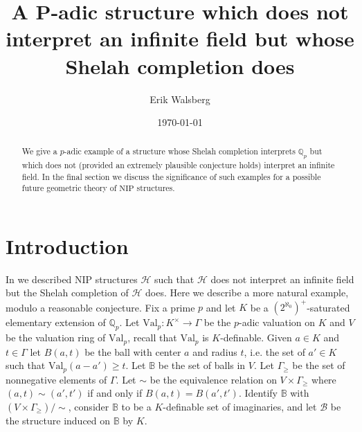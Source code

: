 \documentclass[bibalpha]{amsart}
\theoremstyle{definition}
\theoremstyle{remark}
\newcommand{\valp}{\mathrm{Val}_p}
\newcommand{\nip}{\mathrm{NIP}}
\newcommand{\Sa}[1]{\ensuremath{\mathscr{#1}}}
\newcommand{\B}{\mathbb{B}}
\newcommand{\Q}{\mathbb{Q}}
\begin{document}
\title[]{A P-adic structure which does not interpret an infinite field but whose Shelah completion does}



\author{Erik Walsberg}
\address{Department of Mathematics, Statistics, and Computer Science\\
Department of Mathematics\\University of California, Irvine, 340 Rowland Hall (Bldg.\# 400),
Irvine, CA 92697-3875}


\date{\today}

\maketitle

\begin{abstract}
We give a $p$-adic example of a structure whose Shelah completion interprets $\mathbb{Q}_p$ but which does not (provided an extremely plausible conjecture holds) interpret an infinite field.
In the final section we discuss the significance of such examples for a possible future geometric theory of $\mathrm{NIP}$ structures.
\end{abstract}

\section{Introduction}
\noindent
In \cite{big-nip,field-in-Shelah} we described $\nip$ structures $\Sa H$ such that $\Sa H$ does not interpret an infinite field but the Shelah completion of $\Sa H$ does.
Here we describe a more natural example, modulo a reasonable conjecture.
Fix a prime $p$ and let $K$ be a $(2^{\aleph_0})^+$-saturated elementary extension of $\Q_p$.
Let $\valp : K^\times \to \Gamma$ be the $p$-adic valuation on $K$ and $V$ be the valuation ring of $\valp$, recall that $\valp$ is $K$-definable.
Given $a \in K$ and $t \in \Gamma$ let $B(a,t)$ be the ball with center $a$ and radius $t$, i.e. the set of $a' \in K$ such that $\valp(a - a') \geq t$.
Let $\B$ be the set of balls in $V$.
Let $\Gamma_\geq$ be the set of nonnegative elements of $\Gamma$.
Let $\sim$ be the equivalence relation on $V \times \Gamma_\geq$ where $(a,t) \sim (a',t')$ if and only if $B(a,t) = B(a',t')$. %
Identify $\B$ with $(V \times \Gamma_\geq)/\!\sim$, consider $\B$ to be a $K$-definable set of imaginaries, and let $\Sa B$ be the structure induced on $\B$ by $K$.
\end{document}
